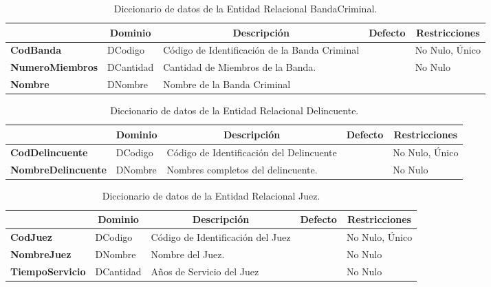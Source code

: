 \begin{table}[H]
\centering
\caption{Diccionario de datos de la Entidad Relacional BandaCriminal.}
\label{tab-DiccR-2c}
\begin{tabular}{>{\bfseries}m{4.0cm}>{}m{3.0cm}>{}m{6.0cm}>{}m{5.0cm}>{}m{2.0cm}}
\toprule
\multicolumn{1}{c}{\textbf{Atributo}} & \multicolumn{1}{c}{\textbf{Dominio}} & \multicolumn{1}{c}{\textbf{Descripción}} & \multicolumn{1}{c}{\textbf{Defecto}} & \multicolumn{1}{c}{\textbf{Restricciones}} \\ \midrule
CodBanda	&	DCodigo	&	Código de Identificación de la Banda Criminal	&		&	No Nulo, Único\\
NumeroMiembros	&	DCantidad	&	Cantidad de Miembros de la Banda.	&		&	No Nulo\\
Nombre	&	DNombre	&	Nombre de la Banda Criminal	&		&	\\
\bottomrule
\end{tabular}
\end{table}

\begin{table}[H]
\centering
\caption{Diccionario de datos de la Entidad Relacional Delincuente.}
\label{tab-DiccR-2d}
\begin{tabular}{>{\bfseries}m{4.0cm}>{}m{3.0cm}>{}m{6.0cm}>{}m{5.0cm}>{}m{2.0cm}}
\toprule
\multicolumn{1}{c}{\textbf{Atributo}} & \multicolumn{1}{c}{\textbf{Dominio}} & \multicolumn{1}{c}{\textbf{Descripción}} & \multicolumn{1}{c}{\textbf{Defecto}} & \multicolumn{1}{c}{\textbf{Restricciones}} \\ \midrule
CodDelincuente	&	DCodigo	&	Código de Identificación del Delincuente	&		&	No Nulo, Único\\
NombreDelincuente	&	DNombre	&	Nombres completos del delincuente.	&		&	No Nulo\\
\bottomrule
\end{tabular}
\end{table}

\begin{table}[H]
\centering
\caption{Diccionario de datos de la Entidad Relacional Juez.}
\label{tab-DiccR-2f}
\begin{tabular}{>{\bfseries}m{4.0cm}>{}m{3.0cm}>{}m{6.0cm}>{}m{5.0cm}>{}m{2.0cm}}
\toprule
\multicolumn{1}{c}{\textbf{Atributo}} & \multicolumn{1}{c}{\textbf{Dominio}} & \multicolumn{1}{c}{\textbf{Descripción}} & \multicolumn{1}{c}{\textbf{Defecto}} & \multicolumn{1}{c}{\textbf{Restricciones}} \\ \midrule
CodJuez	&	DCodigo	&	Código de Identificación del Juez	&		&	No Nulo, Único\\
NombreJuez	&	DNombre	&	Nombre del Juez.	&		&	No Nulo\\
TiempoServicio	&	DCantidad	&	Años de Servicio del Juez	&		&	No Nulo\\
\bottomrule
\end{tabular}
\end{table}

